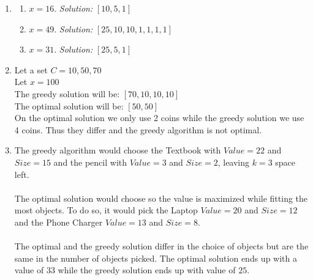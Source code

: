 \documentclass[9pt]{article}
\begin{document}
\begin{enumerate}

    \item 
    \begin{enumerate}
        \item  $x = 16$. \textit{Solution:} $[10,5,1]$
        \item  $x = 49$. \textit{Solution:} $[25,10,10,1,1,1,1]$
        \item  $x = 31$. \textit{Solution:} $[25,5,1]$
    \end{enumerate}
    
    \item
        Let a set $C = {10,50,70}$\\
        Let $x=100$\\
        The greedy solution will be: $[70,10,10,10]$\\
        The optimal solution will be: $[50,50]$\\
        On the optimal solution we only use 2 coins while the greedy solution we use 4 coins. Thus they differ and the greedy algorithm is not optimal.
    
    
    \fi
    
    \newpage
    \vspace{5mm}
    \item 
        The greedy algorithm would choose the Textbook with $Value = 22$ and $Size = 15$ and the pencil with $Value = 3$ and $Size = 2$, leaving $k=3$ space left.\\\\
        The optimal solution would choose so the value is maximized while fitting the most objects. To do so, it would pick the Laptop $Value = 20$ and $Size = 12$ and the Phone Charger $Value = 13$ and $Size = 8$.\\\\
        The optimal and the greedy solution differ in the choice of objects but are the same in the number of objects picked. The optimal solution ends up with a value of $33$ while the greedy solution ends up with value of $25$.
    

\end{enumerate}
\end{document}
